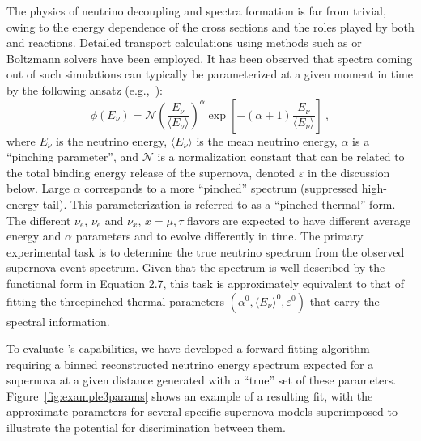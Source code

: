 The physics of neutrino decoupling and spectra formation is far from trivial, owing to the energy dependence of the cross sections and the roles played by both  and  reactions.
Detailed transport calculations using methods such as  or Boltzmann solvers have been employed. It has been observed that spectra coming out of such simulations can typically be parameterized at a given moment in time by the following ansatz (e.g.,~\cite{Minakata:2008nc,Tamborra:2012ac}):
\begin{equation}
        \label{eq:pinched}
        \phi(E_{\nu}) = \mathcal{N} 
        \left(\frac{E_{\nu}}{\langle E_{\nu} \rangle}\right)^{\alpha} \exp\left[-\left(\alpha + 1\right)\frac{E_{\nu}}{\langle E_{\nu} \rangle}\right] \ ,
\end{equation}
where $E_{\nu}$ is the neutrino energy, $\langle E_\nu \rangle$ is the
mean neutrino energy, $\alpha$ is a ``pinching parameter'', and
$\mathcal{N}$ is a normalization constant that can be related to 
the total binding energy release of the supernova, denoted $\varepsilon$ 
in the discussion below.
%
Large $\alpha$ corresponds to a more ``pinched'' spectrum (suppressed
high-energy tail). This parameterization is referred to as a
``pinched-thermal'' form. The different $\nu_e$, $\overline{\nu}_e$ and
$\nu_x, \, x = \mu, \tau$ flavors are expected to have different
average energy and $\alpha$ parameters and to evolve differently in
time. 
The primary experimental task is to determine the true neutrino spectrum from the observed supernova event spectrum.  Given that the spectrum is well described by the functional form in Equation 2.7, this task is approximately equivalent to that of fitting the threepinched-thermal parameters  $(\alpha^0, \langle E_\nu \rangle^0, \varepsilon^0)$ that carry the spectral information.  

To evaluate 's capabilities, we have developed a
forward fitting algorithm requiring a binned reconstructed 
neutrino energy spectrum expected for 
a supernova at a given distance generated with a ``true'' set of
these parameters. %
Figure~\ref{fig:example3params} shows an example of a resulting fit,
with the approximate parameters for several specific supernova models
superimposed to illustrate the potential for discrimination 
between them.


